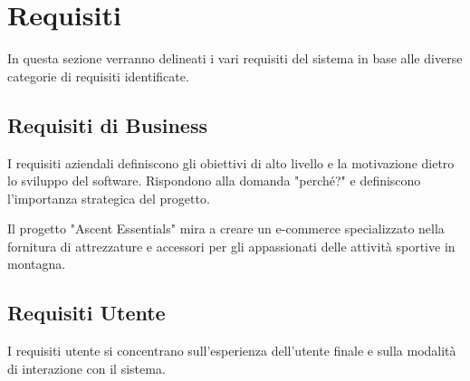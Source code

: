 
\chapter{Requisiti}

In questa sezione verranno delineati i vari requisiti del sistema in base alle diverse categorie di requisiti identificate.

\section{Requisiti di Business}
I requisiti aziendali definiscono gli obiettivi di alto livello e la motivazione dietro lo sviluppo del software. Rispondono alla domanda "perché?" e definiscono l'importanza strategica del progetto.

Il progetto "Ascent Essentials" mira a creare un e-commerce specializzato nella fornitura di attrezzature e accessori per gli appassionati delle attività sportive in montagna.

\section{Requisiti Utente}
I requisiti utente si concentrano sull'esperienza dell'utente finale e sulla modalità di interazione con il sistema.

